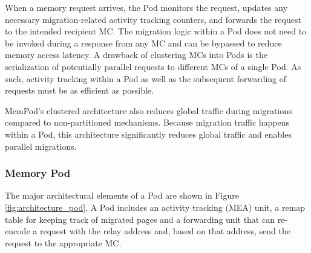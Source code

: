 When a memory request arrives, the Pod monitors the request, updates any 
necessary migration-related activity tracking counters, and forwards 
the request to the intended recipient MC. The migration logic within a Pod does not need to be invoked during a response from any MC and can be bypassed to reduce memory access latency. A drawback of clustering MCs into Pods is the serialization of potentially parallel requests to different MCs of a single Pod. As such, activity tracking within a Pod as well as the subsequent forwarding of requests must be as efficient as possible. 

MemPod's clustered architecture also reduces global traffic during migrations compared to non-partitioned mechanisms. Because migration
traffic happens within a Pod, this architecture significantly reduces global traffic and enables parallel migrations.

\subsubsection*{Memory Pod}

The major architectural elements of a Pod are shown in Figure \ref{fig:architecture_pod}. A Pod includes an activity tracking (MEA) unit, a remap table for keeping track of migrated pages and a forwarding unit that can re-encode a request with the relay address and, based on that address, send the request to the appropriate MC.
%

